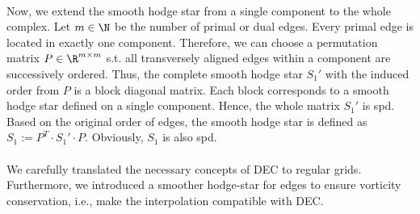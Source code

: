\paragraph*{}
Now, we extend the smooth hodge star from a single component to the whole complex.
Let $m \in \N$ be the number of primal or dual edges.
Every primal edge is located in exactly one component. 
Therefore, we can choose a permutation matrix $P \in \R^{ m \times m }$ s.t. all transversely aligned edges within a component are successively ordered. 
Thus, the complete smooth hodge star ${S_1}'$ with the induced order from $P$ is a block diagonal matrix.
Each block corresponds to a smooth hodge star defined on a single component. Hence, the whole matrix ${S_1}'$ is spd.
Based on the original order of edges, the smooth hodge star is defined as $S_1 := P^T \cdot {S_1}' \cdot P$.
Obviously, $S_1$ is also spd.

\paragraph*{}
We carefully translated the necessary concepts of DEC to regular grids.
Furthermore, we introduced a smoother hodge-star for edges to ensure vorticity conservation, i.e., make the interpolation compatible with DEC.